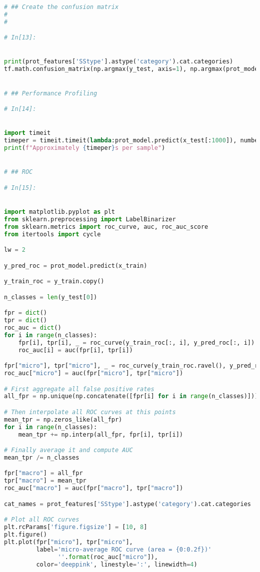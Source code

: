 \documentclass[12pt,letterpaper,oneside,reqno]{book}
\theoremstyle{plain}
\theoremstyle{definition}
\theoremstyle{plain}
\theoremstyle{remark}
\theoremstyle{plain}
\theoremstyle{definition}
\theoremstyle{plain}
\begin{document}
\begin{appendices}
\begin{lstlisting}[language=Python, label=lst:3classfcnnfull, frame=single]
# ## Create the confusion matrix
# 
# 

# In[13]:


print(prot_features['SStype'].astype('category').cat.categories)
tf.math.confusion_matrix(np.argmax(y_test, axis=1), np.argmax(prot_model.predict(x_test), axis=1))


# ## Performance Profiling

# In[14]:


import timeit
timeper = timeit.timeit(lambda:prot_model.predict(x_test[:1000]), number=50)/50000
print(f"Approximately {timeper}s per sample")


# ## ROC

# In[15]:


import matplotlib.pyplot as plt 
from sklearn.preprocessing import LabelBinarizer
from sklearn.metrics import roc_curve, auc, roc_auc_score
from itertools import cycle

lw = 2

y_pred_roc = prot_model.predict(x_train)

y_train_roc = y_train.copy()

n_classes = len(y_test[0])

fpr = dict()
tpr = dict()
roc_auc = dict()
for i in range(n_classes):
    fpr[i], tpr[i], _ = roc_curve(y_train_roc[:, i], y_pred_roc[:, i])
    roc_auc[i] = auc(fpr[i], tpr[i])

fpr["micro"], tpr["micro"], _ = roc_curve(y_train_roc.ravel(), y_pred_roc.ravel())
roc_auc["micro"] = auc(fpr["micro"], tpr["micro"])

# First aggregate all false positive rates
all_fpr = np.unique(np.concatenate([fpr[i] for i in range(n_classes)]))

# Then interpolate all ROC curves at this points
mean_tpr = np.zeros_like(all_fpr)
for i in range(n_classes):
    mean_tpr += np.interp(all_fpr, fpr[i], tpr[i])

# Finally average it and compute AUC
mean_tpr /= n_classes

fpr["macro"] = all_fpr
tpr["macro"] = mean_tpr
roc_auc["macro"] = auc(fpr["macro"], tpr["macro"])

cat_names = prot_features['SStype'].astype('category').cat.categories

# Plot all ROC curves
plt.rcParams['figure.figsize'] = [10, 8]
plt.figure()
plt.plot(fpr["micro"], tpr["micro"],
         label='micro-average ROC curve (area = {0:0.2f})'
               ''.format(roc_auc["micro"]),
         color='deeppink', linestyle=':', linewidth=4)


\end{lstlisting}
\end{appendices}
\end{document}
